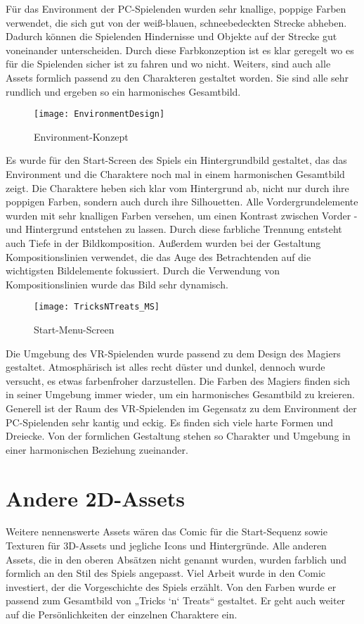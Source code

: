 Für das Environment der PC-Spielenden wurden sehr knallige, poppige Farben verwendet, die sich gut von der weiß-blauen, schneebedeckten Strecke abheben. Dadurch können die Spielenden Hindernisse und Objekte auf der Strecke gut voneinander unterscheiden. Durch diese Farbkonzeption ist es klar geregelt wo es für die Spielenden sicher ist zu fahren und wo nicht. Weiters, sind auch alle Assets formlich passend zu den Charakteren gestaltet worden. Sie sind alle sehr rundlich und ergeben so ein harmonisches Gesamtbild.

\begin{figure}[H]
	\centering
	\texttt{[image: EnvironmentDesign]}
	\caption{Environment-Konzept}
\end{figure}

Es wurde für den Start-Screen des Spiels ein Hintergrundbild gestaltet, das das Environment und die Charaktere noch mal in einem harmonischen Gesamtbild zeigt. Die Charaktere heben sich klar vom Hintergrund ab, nicht nur durch ihre poppigen Farben, sondern auch durch ihre Silhouetten. Alle Vordergrundelemente wurden mit sehr knalligen Farben versehen, um einen Kontrast zwischen Vorder -und Hintergrund entstehen zu lassen. Durch diese farbliche Trennung entsteht auch Tiefe in der Bildkomposition. Außerdem wurden bei der Gestaltung Kompositionslinien verwendet, die das Auge des Betrachtenden auf die wichtigsten Bildelemente fokussiert. Durch die Verwendung von Kompositionslinien wurde das Bild sehr dynamisch.

\begin{figure}[H]
	\centering
	\texttt{[image: TricksNTreats\_MS]}
	\caption{Start-Menu-Screen}
\end{figure}

Die Umgebung des VR-Spielenden wurde passend zu dem Design des Magiers gestaltet. Atmosphärisch ist alles recht düster und dunkel, dennoch wurde versucht, es etwas farbenfroher darzustellen. Die Farben des Magiers finden sich in seiner Umgebung immer wieder, um ein harmonisches Gesamtbild zu kreieren. Generell ist der Raum des VR-Spielenden im Gegensatz zu dem Environment der PC-Spielenden sehr kantig und eckig. Es finden sich viele harte Formen und Dreiecke. Von der formlichen Gestaltung stehen so Charakter und Umgebung in einer harmonischen Beziehung zueinander.

\section{Andere 2D-Assets}
Weitere nennenswerte Assets wären das Comic für die Start-Sequenz sowie Texturen für 3D-Assets und jegliche Icons und Hintergründe. Alle anderen Assets, die in den oberen Absätzen nicht genannt wurden, wurden farblich und formlich an den Stil des Spiels angepasst. 
Viel Arbeit wurde in den Comic investiert, der die Vorgeschichte des Spiels erzählt. Von den Farben wurde er passend zum Gesamtbild von „Tricks ‘n‘ Treats“ gestaltet. Er geht auch weiter auf die Persönlichkeiten der einzelnen Charaktere ein.


